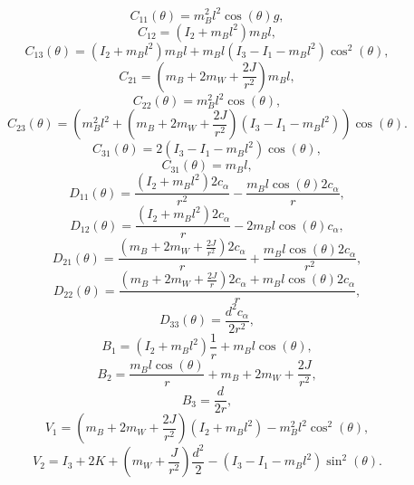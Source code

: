 	\begin{equation}
		C_{11}(\theta) = m_B^2 l^2 \cos(\theta)g,
	\end{equation}
	\begin{equation}
		C_{12} = (I_2 + m_B l^2) m_B l,
	\end{equation}
	\begin{equation}
		C_{13}(\theta) = (I_2 + m_B l^2) m_B l + m_B l (I_3 - I_1 - m_B l^2) \cos^2(\theta),
	\end{equation}
	\begin{equation}
		C_{21} = (m_B + 2m_W + \frac{2J}{r^2}) m_B l,
	\end{equation}
	\begin{equation}
		C_{22}(\theta) = m_B^2 l^2 \cos(\theta),
	\end{equation}
	\begin{equation}
		C_{23}(\theta) = (m_B^2 l^2 + (m_B + 2m_W + \frac{2J}{r^2}) (I_3 - I_1 - m_B l^2) )\cos(\theta).
	\end{equation}
	\begin{equation}
		C_{31}(\theta) = 2 (I_3 - I_1 - m_Bl^2) \cos(\theta),
	\end{equation}
	\begin{equation}
		C_{31}(\theta)  = m_B l,
	\end{equation}
	\begin{equation}
		D_{11}(\theta) = \frac{(I_2 + m_Bl^2) 2c_\alpha}{r^2} - \frac{m_B l \cos(\theta) 2c_\alpha}{r},
	\end{equation}
	\begin{equation}
		D_{12}(\theta) = \frac{(I_2 + m_Bl^2) 2c_\alpha}{r} - 2m_B l \cos(\theta) c_\alpha,
	\end{equation}
	\begin{equation}
		D_{21}(\theta) = \frac{(m_B + 2m_W + \frac{2J}{r^2}) 2c_\alpha}{r} + \frac{m_B l \cos(\theta) 2c_\alpha}{r^2},
	\end{equation}
	\begin{equation}
		D_{22}(\theta) = \frac{(m_B + 2m_W + \frac{2J}{r}) 2c_\alpha + m_B l \cos(\theta) 2c_\alpha}{r},
	\end{equation}
	\begin{equation}
		D_{33}(\theta) = \frac{d^2 c_\alpha}{2r^2 },
	\end{equation}
	\begin{equation}
		B_{1} = (I_2 + m_Bl^2) \frac{1}{r} + m_B l \cos(\theta),
	\end{equation}
	\begin{equation}
		B_{2} = \frac{m_B l \cos(\theta)}{r} + m_B + 2m_W + \frac{2J}{r^2},
	\end{equation}
	\begin{equation}
		B_{3} = \frac{d}{2r},
	\end{equation}
	\begin{equation}
		V_{1} = (m_B + 2m_W + \frac{2J}{r^2}) (I_2 + m_Bl^2) - m_B^2l^2 \cos^2(\theta),
	\end{equation}
	\begin{equation}
		V_{2} = I_3 + 2K + (m_W + \frac{J}{r^2}) \frac{d^2}{2} - (I_3 - I_1 - m_Bl^2) \sin^2(\theta).
	\end{equation}

